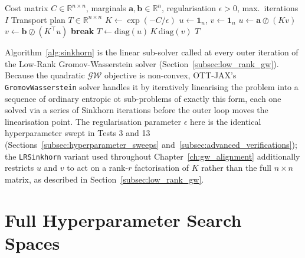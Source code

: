 \begin{algorithm}[H]
\caption{Sinkhorn Matrix Scaling (entropic OT sub-solver)}
\label{alg:sinkhorn}
\begin{algorithmic}[1]
\Require Cost matrix $C \in \mathbb{R}^{n \times n}$, marginals $\mathbf{a}, \mathbf{b} \in \mathbb{R}^n$, regularisation $\epsilon > 0$, max.\ iterations $I$
\Ensure Transport plan $T \in \mathbb{R}^{n \times n}$
\State $K \gets \exp(-C / \epsilon)$ 
\State $u \gets \mathbf{1}_n$, $v \gets \mathbf{1}_n$
\State $u \gets \mathbf{a} \oslash (K v)$ 
\State $v \gets \mathbf{b} \oslash (K^\top u)$
\State \textbf{break} 
\EndIf
\EndFor
\State $T \gets \mathrm{diag}(u) \, K \, \mathrm{diag}(v)$
\State \Return $T$
\end{algorithmic}
\end{algorithm}

Algorithm~\ref{alg:sinkhorn} is the linear sub-solver called at every outer iteration of the Low-Rank Gromov-Wasserstein solver (Section~\ref{subsec:low_rank_gw}). Because the quadratic $\mathcal{GW}$ objective is non-convex, OTT-JAX's \texttt{GromovWasserstein} solver handles it by iteratively linearising the problem into a sequence of ordinary entropic \gls{ot} sub-problems of exactly this form, each one solved via a series of Sinkhorn iterations before the outer loop moves the linearisation point. The regularisation parameter $\epsilon$ here is the identical hyperparameter swept in Tests 3 and 13 (Sections~\ref{subsec:hyperparameter_sweeps} and~\ref{subsec:advanced_verifications}); the \texttt{LRSinkhorn} variant used throughout Chapter~\ref{ch:gw_alignment} additionally restricts $u$ and $v$ to act on a rank-$r$ factorisation of $K$ rather than the full $n \times n$ matrix, as described in Section~\ref{subsec:low_rank_gw}.

\section{Full Hyperparameter Search Spaces}
\label{sec:app_hyperparam_spaces}

